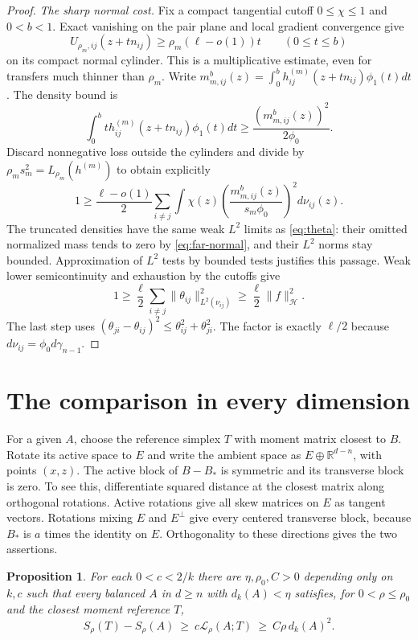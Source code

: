 \documentclass[11pt,reqno]{amsart}
\newtheorem{proposition}[theorem]{Proposition}
\newcommand{\R}{\mathbb R}
\newcommand{\norm}[1]{\lVert #1\rVert}
\newcommand{\ga}{\gamma}
\newcommand{\LL}{\mathcal L}
\newcommand{\HH}{\mathcal H}
\begin{document}
\begin{proof}
\smallskip\noindent\emph{The sharp normal cost.}
Fix a compact tangential cutoff $0\le\chi\le1$ and $0<b<1$.
Exact vanishing on the pair plane and local gradient convergence give
\[
 U_{\rho_m,ij}(z+tn_{ij})\ge\rho_m(\ell-o(1))t
 \qquad(0\le t\le b)
\]
on its compact normal cylinder. This is a multiplicative estimate, even
for transfers much thinner than $\rho_m$. Write
$m_{m,ij}^b(z)=\int_0^b h_{ij}^{(m)}(z+tn_{ij})\phi_1(t)dt$.
The density bound is
\[
 \int_0^b t h_{ij}^{(m)}(z+tn_{ij})\phi_1(t)dt
       \ge\frac{(m_{m,ij}^b(z))^2}{2\phi_0}.
\]
Discard nonnegative loss outside the cylinders and divide by
$\rho_ms_m^2=L_{\rho_m}(h^{(m)})$ to obtain explicitly
\[
 1\ge\frac{\ell-o(1)}2\sum_{i\ne j}
       \int\chi(z)\left(\frac{m_{m,ij}^b(z)}{s_m\phi_0}\right)^2d\nu_{ij}(z).
\]
The truncated densities have the same weak $L^2$ limits as
\eqref{eq:theta}: their omitted normalized mass tends to zero by
\eqref{eq:far-normal}, and their $L^2$ norms stay bounded.
Approximation of $L^2$ tests by bounded tests justifies this passage.
Weak lower semicontinuity and exhaustion by the cutoffs give
\begin{equation}\label{eq:ordered-liminf}
 1\ge\frac\ell2\sum_{i\ne j}\norm{\theta_{ij}}_{L^2(\nu_{ij})}^2
       \ge\frac\ell2\norm f_\HH^2.
\end{equation}
The last step uses $(\theta_{ji}-\theta_{ij})^2\le
\theta_{ij}^2+\theta_{ji}^2$. The factor is exactly $\ell/2$ because
$d\nu_{ij}=\phi_0d\ga_{n-1}$.
\end{proof}

\section{The comparison in every dimension}\label{sec:comparison}

For a given $A$, choose the reference simplex $T$ with moment matrix
closest to $B$. Rotate its active space to $E$ and write the ambient
space as $E\oplus\R^{d-n}$, with points $(x,z)$. The active block of
$B-B_*$ is symmetric and its transverse block is zero. To see this,
differentiate squared distance at the closest matrix along orthogonal
rotations. Active rotations give all skew matrices on $E$ as tangent
vectors. Rotations mixing $E$ and $E^\perp$ give every centered
transverse block, because $B_*$ is $a$ times the identity on $E$.
Orthogonality to these directions gives the two assertions.

\begin{proposition}\label{prop:local}
For each $0<c<2/k$ there are $\eta,\rho_0,C>0$ depending only on $k,c$
such that every balanced $A$ in $d\ge n$ with $d_k(A)<\eta$ satisfies,
for $0<\rho\le\rho_0$ and the closest moment reference $T$,
\[
 S_\rho(T)-S_\rho(A)\ \ge\ c\LL_\rho(A;T)\
                         \ge\ C\rho\,d_k(A)^2.
\]
\end{proposition}
\end{document}
